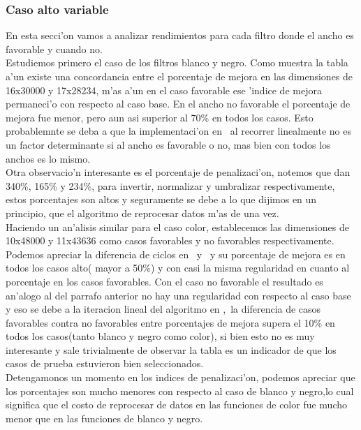 \subsubsection{Caso alto variable}
En esta secci'on vamos a analizar rendimientos para cada filtro donde el ancho es favorable y cuando no.\\
Estudiemos primero el caso de los filtros blanco y negro. Como muestra la tabla a'un existe una 
concordancia entre el porcentaje de mejora en las dimensiones de 16x30000 y 17x28234, m'as a'un 
en el caso favorable ese 'indice de mejora permaneci'o con respecto al caso base. En el ancho
no favorable el porcentaje de mejora fue menor, pero aun asi superior al 70\% en todos los casos.
Esto probablemnte se deba a que la implementaci'on en \C \ al recorrer linealmente no es un factor
determinante si al ancho es favorable o no, mas bien con todos los anchos es lo mismo.\\
Otra observacio'n interesante es el porcentaje de penalizaci'on, notemos que dan 340\%, 165\% y
234\%, para invertir, normalizar y umbralizar respectivamente, estos porcentajes son altos 
y seguramente se debe a lo que dijimos en un principio, que el algoritmo de reprocesar datos m'as de 
una vez.\\%
Haciendo un an'alisis similar para el caso color, establecemos las dimensiones de 10x48000 y 11x43636
como casos favorables y no favorables respectivamente. \\
Podemos apreciar la diferencia de ciclos en \C \ y \ass \ y su porcentaje de mejora es en todos los casos
alto( mayor a 50\%) y con casi la misma regularidad en cuanto al porcentaje en los casos favorables.
Con el caso no favorable el resultado es an'alogo al del parrafo anterior no hay una regularidad con respecto 
al caso base y eso se debe a la iteracion lineal del algoritmo en \C,\ la diferencia de 
casos favorables contra no favorables entre porcentajes
de mejora supera el 10\% en todos los casos(tanto blanco y negro como color), si bien esto no es muy 
interesante y sale trivialmente de observar la tabla es un indicador de que los casos de prueba estuvieron
 bien seleccionados.\\
Detengamonos un momento en los indices de penalizaci'on, podemos apreciar que los porcentajes son mucho 
menores con respecto al caso de blanco y negro,lo cual significa que el costo de reprocesar de datos en
las funciones de color fue mucho menor que en las funciones de blanco y negro.\\
